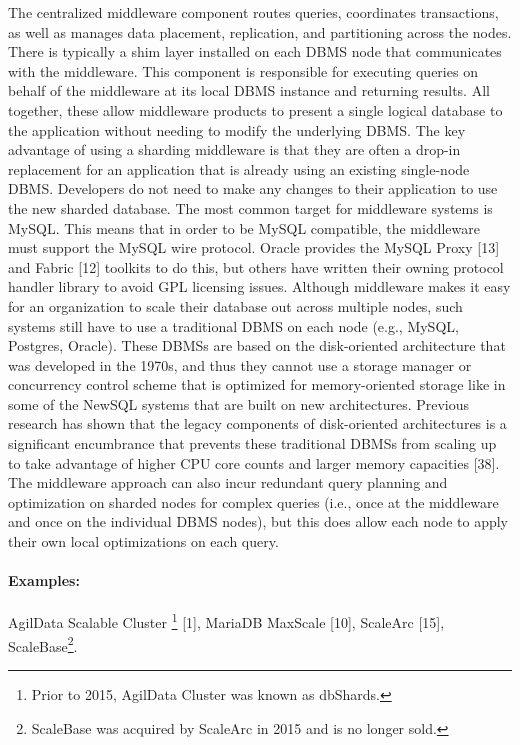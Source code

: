 \documentclass[a4paper,12pt,notitlepage,twoside,openright]{article}
\begin{document}
The centralized middleware component routes queries, coordinates
transactions, as well as manages data placement, replication, and
partitioning across the nodes. There is typically a shim layer installed
on each DBMS node that communicates with the middleware. This component
is responsible for executing queries on behalf of the middleware at its
local DBMS instance and returning results. All together, these allow
middleware products to present a single logical database to the
application without needing to modify the underlying DBMS. The key
advantage of using a sharding middleware is that they are often a
drop-in replacement for an application that is already using an existing
single-node DBMS. Developers do not need to make any changes to their
application to use the new sharded database. The most common target for
middleware systems is MySQL. This means that in order to be MySQL
compatible, the middleware must support the MySQL wire protocol. Oracle
provides the MySQL Proxy {[}13{]} and Fabric {[}12{]} toolkits to do
this, but others have written their owning protocol handler library to
avoid GPL licensing issues. Although middleware makes it easy for an
organization to scale their database out across multiple nodes, such
systems still have to use a traditional DBMS on each node (e.g., MySQL,
Postgres, Oracle). These DBMSs are based on the disk-oriented
architecture that was developed in the 1970s, and thus they cannot use a
storage manager or concurrency control scheme that is optimized for
memory-oriented storage like in some of the NewSQL systems that are
built on new architectures. Previous research has shown that the legacy
components of disk-oriented architectures is a significant encumbrance
that prevents these traditional DBMSs from scaling up to take advantage
of higher CPU core counts and larger memory capacities {[}38{]}. The
middleware approach can also incur redundant query planning and
optimization on sharded nodes for complex queries (i.e., once at the
middleware and once on the individual DBMS nodes), but this does allow
each node to apply their own local optimizations on each query.

\paragraph*{Examples:} AgilData Scalable Cluster \footnote{Prior to 2015, AgilData
  Cluster was known as dbShards.} {[}1{]}, MariaDB MaxScale {[}10{]},
ScaleArc {[}15{]}, ScaleBase\footnote{ScaleBase was acquired by ScaleArc
  in 2015 and is no longer sold.}.
\end{document}
